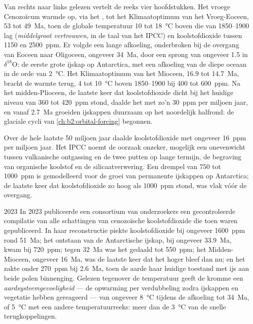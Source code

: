 Van rechts naar links gelezen vertelt de reeks vier hoofdstukken. Het vroege Cenozoïcum warmde op, via het
, tot het Klimaatoptimum van het Vroeg-Eoceen, 53 tot \qty{49}{Ma}, toen
de globale temperatuur 10 tot \qty{18}{\celsius} boven die van 1850--1900 lag (\emph{middelgroot
vertrouwen}, in de taal van het IPCC) en koolstofdioxide tussen 1150 en \qty{2500}{ppm}.
Er volgde een lange afkoeling, onderbroken bij de overgang van Eoceen naar Oligoceen, ongeveer \qty{34}{Ma}, door een
sprong van ongeveer \qty{1.5}{\permil} in $\delta^{18}$O: de eerste grote ijskap op Antarctica, met een
afkoeling van de diepe oceaan in de orde van \qty{2}{\celsius}. Het Klimaatoptimum van het Mioceen, 16.9 tot
\qty{14.7}{Ma}, bracht de warmte terug, 4 tot \qty{10}{\celsius} boven 1850--1900 bij 400 tot
\qty{600}{ppm}. Na het midden-Plioceen, de laatste keer dat koolstofdioxide dicht bij het huidige niveau van 360 tot
\qty{420}{ppm} stond, daalde het met zo'n \qty{30}{ppm} per miljoen jaar, en vanaf \qty{2.7}{Ma} groeiden ijskappen
duurzaam op het noordelijk halfrond: de glaciale cycli van \cref{ch:b2:orbital-forcing} begonnen.

Over de hele laatste 50 miljoen jaar daalde koolstofdioxide met ongeveer \qty{16}{ppm} per miljoen
jaar. Het IPCC noemt de oorzaak onzeker, mogelijk een onevenwicht tussen vulkanische ontgassing en de
twee putten op lange termijn, de begraving van organische koolstof en de silicaatverwering. Een drempel van 750 tot
\qty{1000}{ppm} is gemodelleerd voor de groei van permanente ijskappen op Antarctica; de laatste keer dat
koolstofdioxide zo hoog als \qty{1000}{ppm} stond, was vlak vóór de overgang.

\begin{dated}{2023}
In 2023 publiceerde een consortium van onderzoekers een gecontroleerde compilatie van alle schattingen van cenozoïsche
koolstofdioxide die toen waren gepubliceerd. In haar reconstructie piekte koolstofdioxide bij ongeveer \qty{1600}{ppm} rond
\qty{51}{Ma}; het ontstaan van de Antarctische ijskap, bij ongeveer \qty{33.9}{Ma}, kwam bij \qty{720}{ppm}; tegen
\qty{32}{Ma} was het gedaald tot \qty{550}{ppm}; het Midden-Mioceen, ongeveer \qty{16}{Ma}, was de laatste
keer dat het hoger bleef dan nu; en het zakte onder \qty{270}{ppm} bij \qty{2.6}{Ma}, toen de aarde
haar huidige toestand met ijs aan beide polen binnenging. Gelezen tegenover de temperatuur geeft de kromme een
\emph{aardsysteemgevoeligheid} --- de opwarming per verdubbeling zodra ijskappen en vegetatie hebben
gereageerd --- van ongeveer \qty{8}{\celsius} tijdens de afkoeling tot \qty{34}{Ma}, of \qty{5}{\celsius}
met een andere temperatuurreeks: meer dan de \qty{3}{\celsius} van de snelle terugkoppelingen.
\end{dated}

